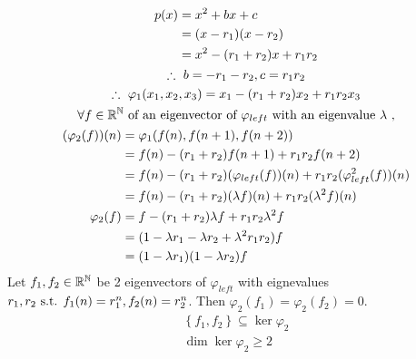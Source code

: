 \documentclass{mathtoolkit}
\begin{document}
\begin{p}
  \item
    \begin{gather*}
      \begin{aligned}
        p(x) & = x^2 + bx +c \\
             & = (x - r_1) (x - r_2) \\
             & = x^2 - (r_1 + r_2) x + r_1 r_2
      \end{aligned} \\
      \therefore b = - r_1 - r_2, c = r_1 r_2 \\
      \therefore \varphi_1(x_1, x_2, x_3) = x_1 - (r_1 + r_2) x_2 + r_1 r_2 x_3 \\
      \forall f \in \field{R}^\field{N} \text{of an eigenvector of $\varphi_{left}$ with an eigenvalue $\lambda$}, \\
      \begin{aligned}
        (\varphi_2(f))(n)
        & = \varphi_1(f(n), f(n+1), f(n+2)) \\
        & = f(n) - (r_1 + r_2) f(n+1) + r_1 r_2 f(n+2) \\
        & = f(n) - (r_1 + r_2) (\varphi_{left}(f))(n) + r_1 r_2 (\varphi_{left}^2(f))(n) \\
        & = f(n) - (r_1 + r_2) (\lambda f)(n) + r_1 r_2 (\lambda^2 f)(n) \\
        \varphi_2(f)
        & = f - (r_1 + r_2) \lambda f + r_1 r_2 \lambda^2 f \\
        & = (1 - \lambda r_1 - \lambda r_2 + \lambda^2 r_1 r_2) f \\
        & = (1 - \lambda r_1) (1 - \lambda r_2) f
      \end{aligned} \\
    \end{gather*}
    Let $f_1, f_2 \in \mathbb{R}^{\mathbb{N}}$ be 2 eigenvectors of $\varphi_{left}$
    with eignevalues $r_1, r_2 \st f_1(n) = r_1^n, f_2(n) = r_2^n$.
    Then $\varphi_2(f_1) = \varphi_2(f_2) = 0$.
    \begin{gather*}
      \left\{ f_1, f_2 \right\} \subseteq \ker{\varphi_2} \\
      \dim{\ker{\varphi_2}} \ge 2
    \end{gather*}


\end{p}
\end{document}
